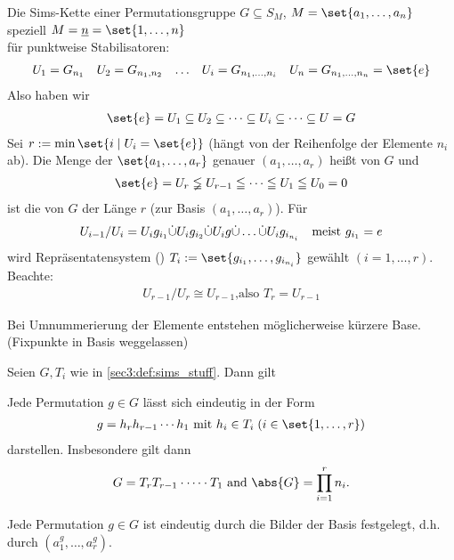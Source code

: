 \begin{definition}
	\label{sec3:def:sims_stuff}
	Die Sims-Kette einer Permutationsgruppe $G \subseteq S_M$, $M = \set{a_1, \dots, a_n}$ speziell $M = \uline{n} = \set{1, \dots, n}$\\
	für punktweise Stabilisatoren:
	\begin{align*}
		\begin{matrix}
			U_1 = G_{n_1} & U_2 = G_{n_1,n_2} & \dots & U_i = G_{n_1,\dots,n_i} &
			U_n = G_{n_1,\dots,n_n} = \set{e}
		\end{matrix}
	\end{align*}
	Also haben wir
	\begin{align*}
		\set{e} = U_1 \subseteq U_2 \subseteq \cdots \subseteq U_i \subseteq \cdots \subseteq U = G
	\end{align*}
	Sei $r:= \min\set{i \mid U_i = \set{e}}$ (hängt von der Reihenfolge der Elemente $n_i$ ab). Die Menge der $\set{a_1, \dots, a_r}$ genauer $(a_1,\dots, a_r)$ heißt  von $G$ und
	\begin{align*}
		\set{e} = U_r \lneqq U_{r-1} \leqq \cdots \leqq U_1 \leqq U_0 = 0
	\end{align*}
	ist die  von $G$ der Länge $r$ (zur Basis $(a_1, \dots, a_r)$). Für
	\begin{align*}
		U_{i-1}/U_i = U_i g_{i_1} \dot\cup U_i g_{i_2} \dot\cup U_i g \dot\cup \dots \dot\cup U_i g_{i_{n_i}}\quad \text{meist }g_{i_1} = e
	\end{align*}
	wird Repräsentatensystem () $T_i := \set{g_{i_1}, \dots, g_{i_{n_i}}}$ gewählt $(i = 1, \dots, r)$.\\
	Beachte: 
	\begin{align*}
		U_{r-1}/U_r \cong U_{r-1}\text{,also } T_r = U_{r-1}
	\end{align*}
\end{definition}
Bei Umnummerierung der Elemente entstehen möglicherweise kürzere Base. (Fixpunkte in Basis weggelassen)
\begin{proposition}
	Seien $G,T_i$ wie in \cref{sec3:def:sims_stuff}. Dann gilt
	\begin{defenum}
		\item Jede Permutation $g \in G$ lässt sich eindeutig in der Form
		\begin{align*}
			g = h_r h_{r-1} \cdots h_1 \mit h_i \in T_i\;(i \in \set{1, \dots, r})
		\end{align*}
		darstellen. Insbesondere gilt dann
		\begin{align*}
			G = T_r T_{r-1} \cdot \dots \cdot T_1 \nd \abs{G} = \prod_{i=1}^r n_i.
		\end{align*} \label{sec3:prop3:unique_simsform}
		\item Jede Permutation $g \in G$ ist eindeutig durch die Bilder der Basis festgelegt, d.h. durch $(a_1^g, \dots, a_r^g)$.\label{sec3:def:unique_image}
	\end{defenum}
\end{proposition}
